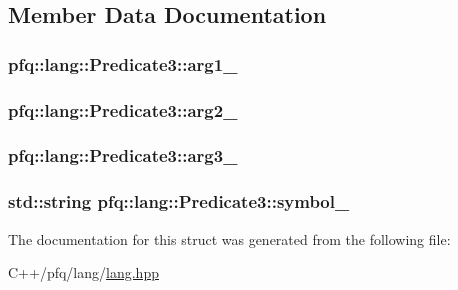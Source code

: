 \subsection{Member Data Documentation}
\hypertarget{structpfq_1_1lang_1_1Predicate3_a2dbec6ae0a1a9a0d7d96f3802c7bc105}{
\subsubsection[{arg1\+\_\+}]{ pfq\+::lang\+::\+Predicate3\+::arg1\+\_\+}}\label{structpfq_1_1lang_1_1Predicate3_a2dbec6ae0a1a9a0d7d96f3802c7bc105}
\hypertarget{structpfq_1_1lang_1_1Predicate3_aa468c48d544055e2f2ee140b6e42f430}{
\subsubsection[{arg2\+\_\+}]{ pfq\+::lang\+::\+Predicate3\+::arg2\+\_\+}}\label{structpfq_1_1lang_1_1Predicate3_aa468c48d544055e2f2ee140b6e42f430}
\hypertarget{structpfq_1_1lang_1_1Predicate3_abfb8ea25114fbaeef11277e930ebab22}{
\subsubsection[{arg3\+\_\+}]{ pfq\+::lang\+::\+Predicate3\+::arg3\+\_\+}}\label{structpfq_1_1lang_1_1Predicate3_abfb8ea25114fbaeef11277e930ebab22}
\hypertarget{structpfq_1_1lang_1_1Predicate3_a52443a0d920e3f09428b667ae772806f}{
\subsubsection[{symbol\+\_\+}]{\setlength{\rightskip}{0pt plus 5cm}std\+::string pfq\+::lang\+::\+Predicate3\+::symbol\+\_\+}}\label{structpfq_1_1lang_1_1Predicate3_a52443a0d920e3f09428b667ae772806f}


The documentation for this struct was generated from the following file\+:\begin{DoxyCompactItemize}
\item 
C++/pfq/lang/\hyperlink{lang_8hpp}{lang.\+hpp}\end{DoxyCompactItemize}
